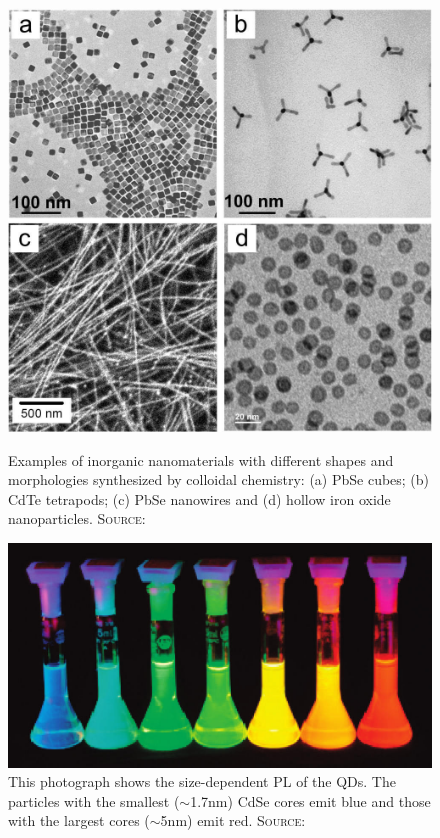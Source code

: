	\begin{figure}[htbp]
		\begin{minipage}[t]{0.49\textwidth}
			\centering
			\includegraphics[width=\textwidth]{Fig/QDshapes.jpg}
			\caption{Examples of inorganic nanomaterials with different
							 shapes and morphologies synthesized by colloidal chemistry:
							 (a) PbSe cubes; (b) CdTe tetrapods; (c) PbSe nanowires and
							 (d) hollow iron oxide nanoparticles.
							 {\scshape Source:} \cite[p.394]{Talapin}}
			\label{fig:QDshapes}
		\end{minipage}
		\hfill
		\begin{minipage}[t]{0.49\textwidth}
			\centering
			\includegraphics[width=\textwidth]{Fig/QDcolor.jpg}
			\caption{This photograph shows the size-dependent \gls{PL} of the QDs. The particles with the smallest ($\sim$1.7nm)
							 CdSe cores emit blue and those with the largest cores ($\sim$5nm) emit red.
							 {\scshape Source:} \cite[p.393]{Talapin}}
			\label{fig:QDcolor}
		\end{minipage}
	\end{figure}			

